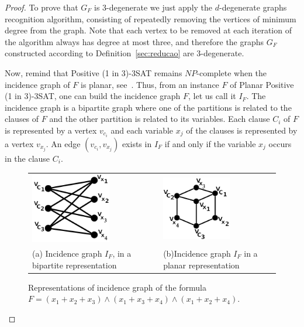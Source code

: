 \documentclass[
submission
]{dmtcs-episciences}
\begin{document}
\begin{proof} %
To prove that $G_F$ is 3-degenerate we just apply the $d$-degenerate graphs recognition algorithm,  consisting of repeatedly removing the vertices of minimum degree from the graph. Note that each vertex to be removed at each iteration of the algorithm always has degree at most three, and therefore the graphs $G_F$ constructed according to Definition~\ref{sec:reducao} are $3$-degenerate.

Now, remind that {\sc Positive (1 in 3)-3SAT} remains $NP$-complete when the incidence graph of $F$ is planar, see~\cite{mulzer2008minimum}. Thus, from an instance $F$ of {\sc Planar Positive (1 in 3)-3SAT}, one can build the incidence graph $F$, let us call it $I_F$. The incidence graph is a bipartite graph where one of the partitions is related to the clauses of $F$ and the other partition is related to its variables. Each clause $ C_i $ of $ F $ is represented by a vertex $ v_{c_i} $ and each variable $ x_j $ of the clauses is represented by a vertex $ v_{x_j} $. An edge $ (v_{c_i}, v_{x_j}) $ exists in $ I_F $ if and only if the variable $ x_j $ occurs in the clause $ C_i $.

%
\begin{figure}[h]
  \centering
  \begin{tabular}{p{4cm} p{1cm} p{4cm}}
     \includegraphics[width=3.5cm, center]{bipartido}%
     &  &\includegraphics[width=3cm, center]{planar}%
     \\
     
     \footnotesize \centering (a) Incidence graph $I_F$,  in a bipartite representation & & \footnotesize \centering (b)Incidence graph $I_F$ in a planar representation%
  \end{tabular}
 \caption{Representations of incidence graph of the formula $F=(x_1+x_2+x_3)\wedge(x_1+x_3+x_4)\wedge(x_1+x_2+x_4)$.}
 \label{fig:grafoIncidencia2apex}
 \label{fig:grafoIncidencia2apexPlanar}
\end{figure}


\end{proof}
\end{document}
